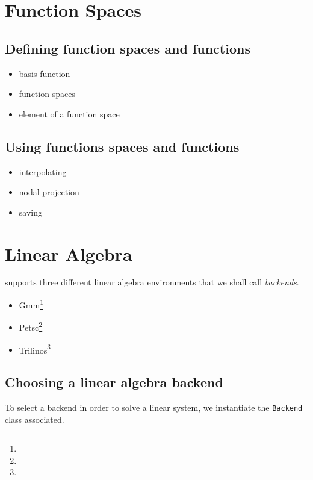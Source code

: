 \section{Function Spaces}
\label{sec:function-spaces}

\subsection{Defining function spaces and functions}

\begin{itemize}
\item basis function
\item function spaces
\item element of a function space
\end{itemize}

\subsection{Using functions spaces and functions}

\begin{itemize}
\item interpolating
\item nodal projection
\item saving
\end{itemize}


\section{Linear Algebra}
\label{sec:linear-algebra}


\feel supports three different linear algebra environments that we
shall call \emph{backends}.
\begin{itemize}
\item Gmm\footnote{}
\item Petsc\footnote{}
\item Trilinos\footnote{}
\end{itemize}


\subsection{Choosing a linear algebra backend}
\label{sec:choos-line-algebra}

To select a backend in order to solve a linear system, we instantiate
the \lstinline!Backend! class associated.

